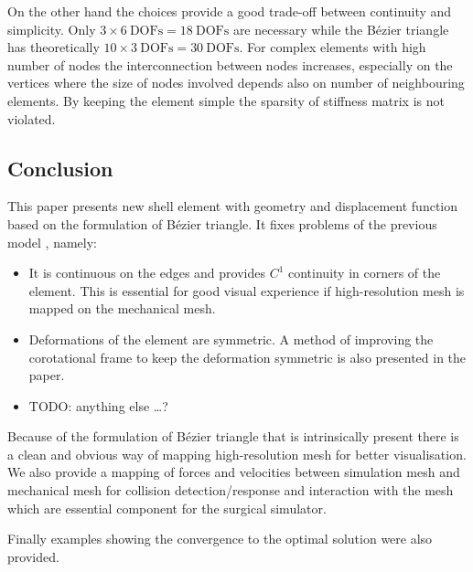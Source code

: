 \documentclass{egpubl}
\begin{document}
On the other hand the choices provide a good trade-off between continuity
and simplicity. Only $ 3 \times 6~\mathrm{DOFs} = 18~\mathrm{DOFs}$ are
necessary while the Bézier triangle has theoretically $ 10 \times
3~\mathrm{DOFs} = 30~\mathrm{DOFs}$. For complex elements with high number
of nodes the interconnection between nodes increases, especially on the
vertices where the size of nodes involved depends also on number of
neighbouring elements. By keeping the element simple the sparsity of
stiffness matrix is not violated.


\subsection{Conclusion} %

This paper presents new shell element with geometry and displacement
function based on the formulation of Bézier triangle. It fixes problems
of the previous model \cite{Comas2010c}, namely:

\begin{itemize}

    \item It is continuous on the edges and provides $C^1$ continuity in
    corners of the element. This is essential for good visual experience if
    high-resolution mesh is mapped on the mechanical mesh.

    \item Deformations of the element are symmetric. A method of improving
    the corotational frame to keep the deformation symmetric is also
    presented in the paper.

    \item TODO: anything else \ldots? %


\end{itemize}

Because of the formulation of Bézier triangle that is intrinsically present
there is a clean and obvious way of mapping high-resolution mesh for
better visualisation. We also provide a mapping of forces and velocities
between simulation mesh and mechanical mesh for collision detection/response
and interaction with the mesh which are essential component for the surgical
simulator.

Finally examples showing the convergence to the optimal solution were also provided. 



%



\end{document}
